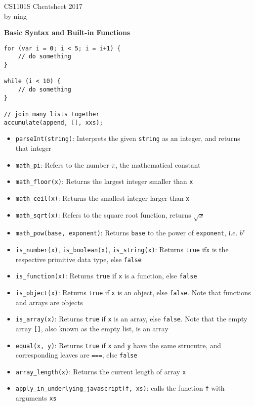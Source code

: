 \documentclass[a4paper]{article} \usepackage[backend=biber, style=numeric, sorting=none]{biblatex}
\begin{document}
\setlength\parindent{0pt} %
\scriptsize
{}

\begin{center}
{\large CS1101S Cheatsheet 2017}\\{by ning}
\end{center}
    \begin{multicols*}{4}

{\small\textbf{Basic Syntax and Built-in Functions}}

\begin{verbatim}
for (var i = 0; i < 5; i = i+1) {
    // do something
}

while (i < 10) {
    // do something
}

// join many lists together
accumulate(append, [], xxs);
\end{verbatim}

\begin{itemize}
\itemsep -0.5em
\item \texttt{parseInt(string)}: Interprets the given \texttt{string} as an integer, and returns that integer
\item \texttt{math\_pi}: Refers to the number $\pi$, the mathematical constant
\item \texttt{math\_floor(x)}: Returns the largest integer smaller than \texttt{x}
\item \texttt{math\_ceil(x)}: Returns the smallest integer larger than \texttt{x}
\item \texttt{math\_sqrt(x)}: Refers to the square root function, returns $\sqrt{x}$
\item \texttt{math\_pow(base, exponent)}: Returns \texttt{base} to the power of \texttt{exponent}, i.e. $b^e$
\item \texttt{is\_number(x)}, \texttt{is\_boolean(x)}, \texttt{is\_string(x)}: Returns \texttt{true} if\texttt{x} is the respective primitive data type, else \texttt{false}
\item \texttt{is\_function(x)}: Returns \texttt{true} if \texttt{x} is a function, else \texttt{false}
\item \texttt{is\_object(x)}: Returns \texttt{true} if \texttt{x} is an object, else \texttt{false}. Note that functions and arrays are objects
\item \texttt{is\_array(x)}: Returns \texttt{true} if \texttt{x} is an array, else \texttt{false}. Note that the empty array \texttt{[]}, also known as the empty list, is an array
\item \texttt{equal(x, y)}: Returns \texttt{true} if \texttt{x} and \texttt{y} have the same strucutre, and corresponding leaves are \texttt{===}, else \texttt{false}
\item \texttt{array\_length(x)}: Returns the current length of array \texttt{x}
\item \texttt{apply\_in\_underlying\_javascript(f, xs)}: calls the function \texttt{f} with arguments \texttt{xs}
\end{itemize}


\end{multicols*}
\end{document}
